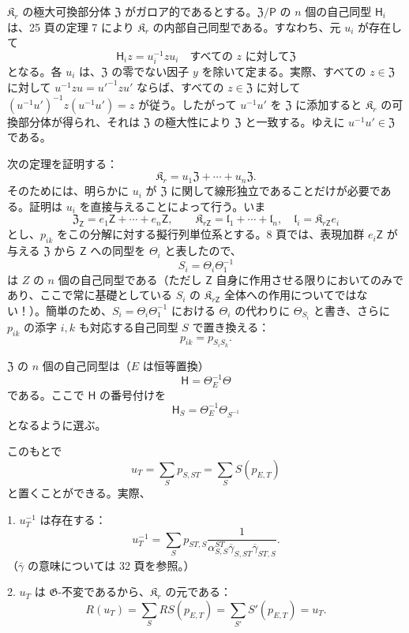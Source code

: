 \(\mathfrak K_r\) の極大可換部分体 \(\mathfrak Z\) がガロア的であるとする。\(\mathfrak Z/\mathsf P\) の \(n\) 個の自己同型 \(\mathsf{H}_i\) は、25 頁の定理 7 により \(\mathfrak K_r\) の内部自己同型である。すなわち、元 \(u_i\) が存在して
\[
\mathsf{H}_i z=u_i^{-1}zu_i\quad\text{すべての }z\text{ に対して}\mathfrak Z
\]
となる。各 \(u_i\) は、\(\mathfrak Z\) の零でない因子 \(y\) を除いて定まる。実際、すべての \(z\in\mathfrak Z\) に対して \(u^{-1}zu=u'^{-1}zu'\) ならば、すべての \(z\in\mathfrak Z\) に対して \((u^{-1}u')^{-1}z(u^{-1}u')=z\) が従う。したがって \(u^{-1}u'\) を \(\mathfrak Z\) に添加すると \(\mathfrak K_r\) の可換部分体が得られ、それは \(\mathfrak Z\) の極大性により \(\mathfrak Z\) と一致する。ゆえに \(u^{-1}u'\in\mathfrak Z\) である。

次の定理を証明する：
\[
\mathfrak K_r=u_1\mathfrak Z+\cdots+u_n\mathfrak Z.
\]
そのためには、明らかに \(u_i\) が \(\mathfrak Z\) に関して線形独立であることだけが必要である。証明は \(u_i\) を直接与えることによって行う。いま
\[
\mathfrak Z_{\mathsf{Z}}=e_1\mathsf{Z}+\cdots+e_n\mathsf{Z},\qquad
\mathfrak K_{r\mathsf{Z}}=\mathfrak l_1+\cdots+\mathfrak l_n,\quad
\mathfrak l_i=\mathfrak K_{r\mathsf{Z}}e_i
\]
とし、\(p_{ik}\) をこの分解に対する擬行列単位系とする。8 頁では、表現加群 \(e_i\mathsf{Z}\) が与える \(\mathfrak Z\) から \(\mathsf{Z}\) への同型を \(\Theta_i\) と表したので、
\[
S_i=\Theta_i\Theta_1^{-1}
\]
は \(Z\) の \(n\) 個の自己同型である（ただし \(\mathsf{Z}\) 自身に作用させる限りにおいてのみであり、ここで常に基礎としている \(S_i\) の \(\mathfrak K_{r\mathsf{Z}}\) 全体への作用についてではない！）。簡単のため、\(S_i=\Theta_i\Theta_1^{-1}\) における \(\Theta_i\) の代わりに \(\Theta_{S_i}\) と書き、さらに \(p_{ik}\) の添字 \(i,k\) も対応する自己同型 \(S\) で置き換える：
\[
p_{ik}=p_{S_iS_k}.
\]

\(\mathfrak Z\) の \(n\) 個の自己同型は（\(E\) は恒等置換）
\[
\mathsf{H}=\Theta_E^{-1}\Theta
\]
である。ここで \(\mathsf{H}\) の番号付けを
\[
\mathsf{H}_S=\Theta_E^{-1}\Theta_{S^{-1}}
\]
となるように選ぶ。

このもとで
\[
u_T=\sum_S p_{S,ST}=\sum_S S(p_{E,T})
\]
と置くことができる。実際、

1. \(u_T^{-1}\) は存在する：
\[
u_T^{-1}=\sum_S p_{ST,S}
\frac{1}{\alpha_{S,S}^{ST}\overline{\gamma}_{S,ST}\overline{\gamma}_{ST,S}}.
\]
（\(\bar\gamma\) の意味については 32 頁を参照。）

2. \(u_T\) は \(\mathfrak G\)-不変であるから、\(\mathfrak K_r\) の元である：
\[
R(u_T)=\sum_S RS(p_{E,T})=\sum_{S'} S'(p_{E,T})=u_T.
\]

